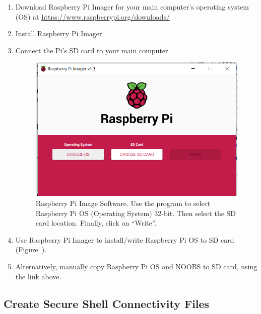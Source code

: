 \documentclass{article}
\begin{document}
\begin{enumerate}
  \item Download Raspberry Pi Imager for your main computer's operating system (OS) at \url{https://www.raspberrypi.org/downloads/}
  \item Install Raspberry Pi Imager
  \item Connect the Pi's SD card to your main computer.
  
\begin{figure}
\includegraphics[width=1.00\textwidth]{1_Pi_Imager}
\caption{Raspberry Pi Image Software. Use the program to select Raspberry Pi OS (Operating System) 32-bit. Then select the SD card location. Finally, click on ``Write''.}
\label{fig:pi_imager}
\end{figure}

  \item Use Raspberry Pi Imager to install/write Raspberry Pi OS to SD card (Figure~\label{fig:pi_imager}).
  \item Alternatively, manually copy Raspberry Pi OS and NOOBS to SD card, using the link above.
\end{enumerate}

\subsection{Create Secure Shell Connectivity Files} \label{networkssh}
\end{document}
